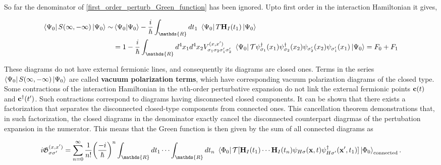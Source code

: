 So far the denominator of \cref{first_order_perturb_Green_function} has been ignored. Upto first order in the interaction Hamiltonian it gives, 

\begin{equation}
    \begin{split}
        \bra{\Psi_0} S(\infty, -\infty) \ket{\Psi_0} \sim&
        \bra{\Psi_0} \ket{\Psi_0} - \frac{i}{\hbar} \int_{\mathds{R}} dt_1 \blanky \bra{\Psi_0} T {\bf H}_I(t_1) \ket{\Psi_0} \\
        &= 1 - \frac{i}{\hbar} \int_{\mathds{R}} d^4 x_1 d^4 x_2 V_{\sigma_1 \sigma_2 \sigma'_1 \sigma'_2}^{(x, x')} \blanky \bra{\Psi_0} \mathcal{T} 
        \psi_{\sigma_1}^\dagger(x_1)
        \psi_{\sigma_2}^\dagger(x_2)
        \psi_{\sigma'_2}(x_2)
        \psi_{\sigma'_1}(x_1)
        \ket{\Psi_0} = F_0 + F_1
    \end{split}     
\end{equation}

These diagrams do not have external fermionic lines, and consequently its diagrams are closed ones. Terms in the series $\bra{\Psi_0} S(\infty, -\infty) \ket{\Psi_0}$ are called \textbf{vacuum polarization terms}, which have corresponding vacuum polarization diagrams of the closed type. Some contractions of the interaction Hamiltonian in the $n$th-order perturbative expansion do not link the external fermionic points ${\bf c}(t)$ and ${\bf c}^\dagger(t')$. Such contractions correspond to diagrams having disconnected closed components. It can be shown that there exists a factorization that separates the disconnected closed-type components from connected ones. This cancellation theorem demonstrations that, in such factorization, the closed diagrams in the denominator exactly cancel the disconnected counterpart diagrmas of the pertubation expansion in the numerator. This means that the Green function is then given by the sum of all connected diagrams as 

\begin{equation}
    \begin{split}
        i \mathfrak{G}_{\sigma \sigma'}^{(x,x')} = \sum_{n=0}^{\infty} \frac{1}{n!} \bigg(\frac{-i}{\hbar}\bigg)^n \int_{\mathds{R}} dt_1 \cdots \int_{\mathds{R}} dt_n \blanky \bra{\Phi_0} \mathcal{T} [ {\bf H}_I(t_1) \cdots {\bf H}_I(t_n) \psi_{H \sigma}({\bf x}, t) \psi_{H \sigma'}^\dagger({\bf x}', t_1)]\ket{\Phi_0}_{\textnormal{connected}}.
    \end{split}
\end{equation}

